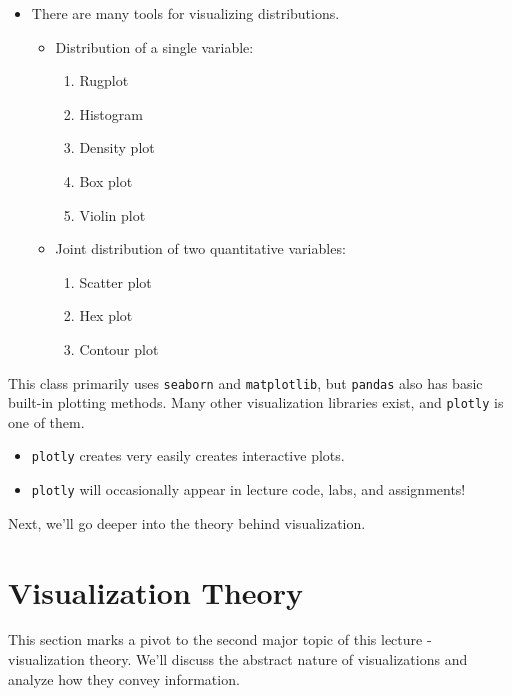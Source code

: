 \documentclass[
  letterpaper,
  DIV=11,
  numbers=noendperiod]{scrreprt}
\providecommand{\tightlist}{%
  \setlength{\itemsep}{0pt}\setlength{\parskip}{0pt}}\usepackage{longtable,booktabs,array}
\begin{document}
\begin{itemize}
\tightlist
\item
  There are many tools for visualizing distributions.

  \begin{itemize}
  \tightlist
  \item
    Distribution of a single variable:

    \begin{enumerate}
    \def\labelenumi{\arabic{enumi}.}
    \tightlist
    \item
      Rugplot
    \item
      Histogram
    \item
      Density plot
    \item
      Box plot
    \item
      Violin plot
    \end{enumerate}
  \item
    Joint distribution of two quantitative variables:

    \begin{enumerate}
    \def\labelenumi{\arabic{enumi}.}
    \tightlist
    \item
      Scatter plot
    \item
      Hex plot
    \item
      Contour plot
    \end{enumerate}
  \end{itemize}
\end{itemize}

This class primarily uses \texttt{seaborn} and \texttt{matplotlib}, but
\texttt{pandas} also has basic built-in plotting methods. Many other
visualization libraries exist, and \texttt{plotly} is one of them.

\begin{itemize}
\tightlist
\item
  \texttt{plotly} creates very easily creates interactive plots.
\item
  \texttt{plotly} will occasionally appear in lecture code, labs, and
  assignments!
\end{itemize}

Next, we'll go deeper into the theory behind visualization.

\section{Visualization Theory}\label{visualization-theory}

This section marks a pivot to the second major topic of this lecture -
visualization theory. We'll discuss the abstract nature of
visualizations and analyze how they convey information.
\end{document}
